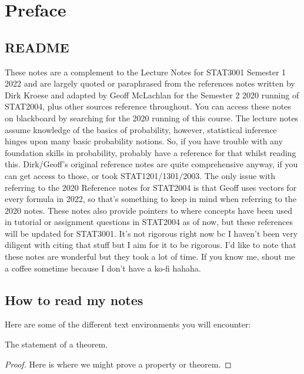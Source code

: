 \chapter*{Preface}

\section*{README}

These notes are a complement to the Lecture Notes for STAT3001 
Semester 1 2022 and are largely quoted or paraphrased from 
the references notes written by Dirk Kroese and adapted by Geoff McLachlan 
for the Semester 2 2020 running of STAT2004, plus other sources reference throughout. 
You can access these notes on blackboard by searching for the 2020 running of this course. 
\bigskip
The lecture notes assume knowledge of the basics of probability, however, statistical inference hinges upon many basic probability notions. 
So, if you have trouble with any foundation skills in probability, probably have a reference for that whilst reading this. 
Dirk/Geoff's original reference notes are quite comprehensive anyway, if you can get access to those, or took STAT1201/1301/2003. 
The only issue with referring to the 2020 Reference notes for STAT2004 is that Geoff uses vectors for every formula in 2022, so that's something to keep in mind when referring to the 2020 notes. 
\bigskip
These notes also provide pointers to where concepts have been used in tutorial or assignment questions in STAT2004 as of now, but these references will be updated for STAT3001. 
It's not rigorous right now bc I haven't been very diligent with citing that stuff but I aim for it to be rigorous. 
\bigskip
I'd like to note that these notes are wonderful but they 
took a lot of time. 
If you know me, shout me a coffee sometime because I don't have a ko-fi hahaha. 

\section*{How to read my notes}

Here are some of the different text environments you will encounter:
\begin{theorem}
    The statement of a theorem. 
\end{theorem}

\begin{proof}%
    Here is where we might prove a property or theorem. 
\end{proof}


